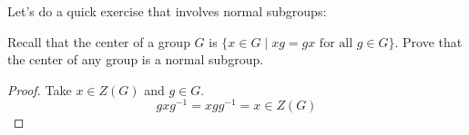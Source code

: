 Let's do a quick exercise that involves normal subgroups: 

Recall that the center of a group $G$ is $\{x\in G\mid xg=gx\text{ for all }g\in G\}$. Prove that the center of any group is a normal subgroup. 

\begin{proof}
	Take $x\in Z(G)$ and $g\in G$. 
	\[gxg^{-1} = xgg^{-1} = x\in Z(G)\]
\end{proof}
